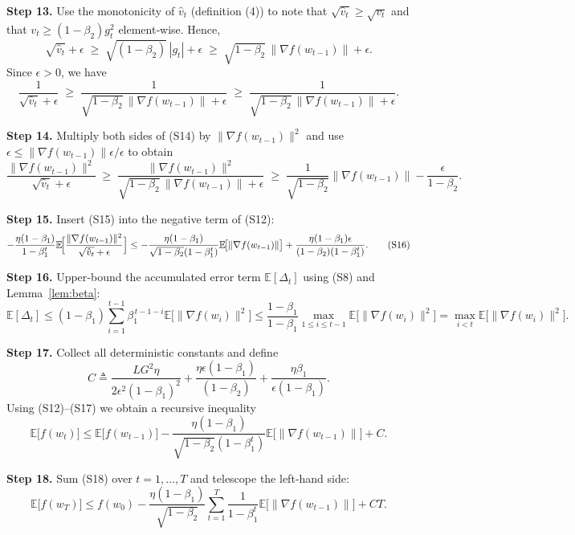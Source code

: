 \documentclass[11pt]{article}
\newcommand{\E}{\mathbb{E}}
\begin{document}
\textbf{Step 13.} Use the monotonicity of $\hat v_{t}$ (definition (4)) to note
that $\sqrt{\hat v_{t}}\ge \sqrt{v_{t}}$ and that $v_{t}\ge (1-\beta_{2})g_{t}^{2}$
element‑wise.  Hence,
\[
\sqrt{\hat v_{t}}+\epsilon\;\ge\;
\sqrt{(1-\beta_{2})}\,|g_{t}|+\epsilon
\;\ge\;
\sqrt{1-\beta_{2}}\,\|\nabla f(w_{t-1})\|+\epsilon. \tag{S13}
\]
Since $\epsilon>0$, we have
\[
\frac{1}{\sqrt{\hat v_{t}}+\epsilon}
\;\ge\;
\frac{1}{\sqrt{1-\beta_{2}}\,\|\nabla f(w_{t-1})\|+\epsilon}
\;\ge\;
\frac{1}{\sqrt{1-\beta_{2}}\,\|\nabla f(w_{t-1})\|+\epsilon}. \tag{S14}
\]

\textbf{Step 14.} Multiply both sides of (S14) by $\|\nabla f(w_{t-1})\|^{2}$ and
use $\epsilon\le\|\nabla f(w_{t-1})\|\epsilon/\epsilon$ to obtain
\[
\frac{\|\nabla f(w_{t-1})\|^{2}}{\sqrt{\hat v_{t}}+\epsilon}
\;\ge\;
\frac{\|\nabla f(w_{t-1})\|^{2}}{\sqrt{1-\beta_{2}}\,\|\nabla f(w_{t-1})\|+\epsilon}
\;\ge\;
\frac{1}{\sqrt{1-\beta_{2}}}\|\nabla f(w_{t-1})\|
- \frac{\epsilon}{1-\beta_{2}}. \tag{S15}
\]

\textbf{Step 15.} Insert (S15) into the negative term of (S12):
\[
- \frac{\eta(1-\beta_{1})}{1-\beta_{1}^{t}}
\E\!\Bigl[\frac{\|\nabla f(w_{t-1})\|^{2}}{\sqrt{\hat v_{t}}+\epsilon}\Bigr]
\le
- \frac{\eta(1-\beta_{1})}{\sqrt{1-\beta_{2}}(1-\beta_{1}^{t})}
\E\!\bigl[\|\nabla f(w_{t-1})\|\bigr]
+ \frac{\eta(1-\beta_{1})\epsilon}{(1-\beta_{2})(1-\beta_{1}^{t})}. \tag{S16}
\]

\textbf{Step 16.} Upper‑bound the accumulated error term $\E[\Delta_{t}]$
using (S8) and Lemma~\ref{lem:beta}:
\[
\E[\Delta_{t}]
\le (1-\beta_{1})\sum_{i=1}^{t-1}\beta_{1}^{\,t-1-i}
\E\!\bigl[\|\nabla f(w_{i})\|^{2}\bigr]
\le \frac{1-\beta_{1}}{1-\beta_{1}} \max_{1\le i\le t-1}
\E\!\bigl[\|\nabla f(w_{i})\|^{2}\bigr]
= \max_{i<t}\E\!\bigl[\|\nabla f(w_{i})\|^{2}\bigr]. \tag{S17}
\]

\textbf{Step 17.} Collect all deterministic constants and define
\[
C\triangleq \frac{L G^{2}\eta}{2\epsilon^{2}(1-\beta_{1})^{2}}+\frac{\eta\epsilon(1-\beta_{1})}{(1-\beta_{2})}
+\frac{\eta\beta_{1}}{\epsilon(1-\beta_{1})}.
\]
Using (S12)–(S17) we obtain a recursive inequality
\[
\E\!\bigl[f(w_{t})\bigr]\le
\E\!\bigl[f(w_{t-1})\bigr]
-\frac{\eta(1-\beta_{1})}{\sqrt{1-\beta_{2}}(1-\beta_{1}^{t})}
\E\!\bigl[\|\nabla f(w_{t-1})\|\bigr]
+ C. \tag{S18}
\]

\textbf{Step 18.} Sum (S18) over $t=1,\dots,T$ and telescope the left‑hand side:
\[
\E\!\bigl[f(w_{T})\bigr] \le f(w_{0}) - 
\frac{\eta(1-\beta_{1})}{\sqrt{1-\beta_{2}}}
\sum_{t=1}^{T}\frac{1}{1-\beta_{1}^{t}}
\E\!\bigl[\|\nabla f(w_{t-1})\|\bigr] + C T. \tag{S19}
\]
\end{document}
